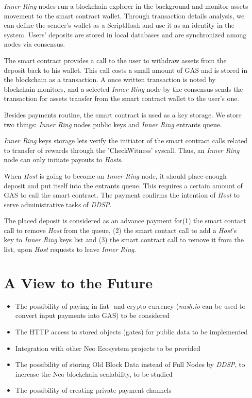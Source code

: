 \documentclass[a4paper, 11pt]{article}
\begin{document}
\textit{Inner Ring} nodes run a blockchain explorer in the background and monitor assets
movement to the smart contract wallet. Through transaction details analysis, we
can define the sender's wallet as a ScriptHash and use it as an identity in the system. Users' deposits are stored in local databases and are synchronized among
nodes via consensus.

The smart contract provides a call to the user to withdraw assets from the deposit back
to his wallet. This call costs a small amount of GAS and is stored in
the blockchain as a transaction. A once written transaction is noted by 
blockchain monitors, and a selected \textit{Inner Ring} node by the consensus sends the transaction for
assets transfer from the smart contract wallet to the user's one.

Besides payments routine, the smart contract is used as a key storage. We store
two things: \textit{Inner Ring} nodes public keys and \textit{Inner Ring} entrants queue.

\textit{Inner Ring} keys storage lets verify the initiator of the smart contract calls related to transfer of rewards
through the 'CheckWitness' syscall. Thus, an \textit{Inner Ring} node can only initiate payouts to \textit{Hosts}.

When \textit{Host} is going to become an \textit{Inner Ring} node, it should place enough deposit
and put itself into the entrants queue. This requires a certain amount of GAS to call the smart contract. The payment confirms the intention of \textit{Host} to serve administrative tasks of \textit{DDSP}.

The placed deposit is considered as an advance payment for(1) the smart
contact call to remove \textit{Host} from the queue, (2) the smart contact call to add a \textit{Host}'s key
to \textit{Inner Ring} keys list and (3) the smart contract call to remove it from the list, upon
\textit{Host} requests to leave \textit{Inner Ring}.

\section{A View to the Future}
\begin{itemize}
    \item The possibility of paying in fiat- and crypto-currency (\textit{nash.io} can be
      used to convert input payments into GAS) to be considered

    \item The HTTP access to stored objects (gates) for public data to be
      implemented

    \item Integration with other Neo Ecosystem projects to be provided

    \item The possibility of storing Old Block Data instead of Full Nodes by
      \textit{DDSP}, to increase the Neo blockchain
      scalability, to be studied

    \item The possibility of creating private payment channels

\end{itemize}
\end{document}
